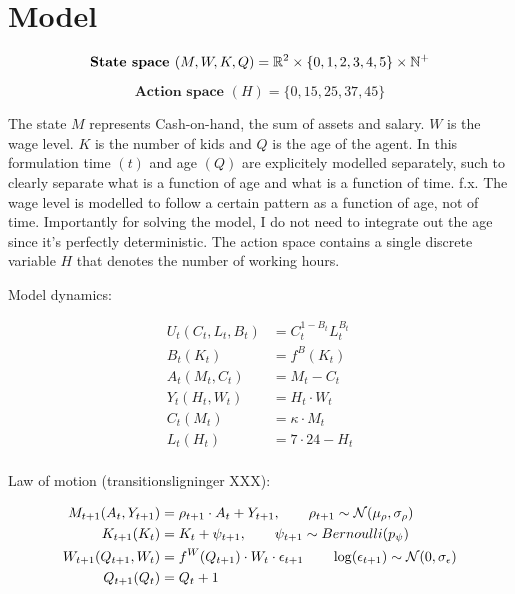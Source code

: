\section{Model}

\begin{equation}
    \textbf{State space } (M, W, K, Q) = \mathbb{R}^{2} \times \{0, 1, 2, 3, 4, 5\} \times \mathbb{N}^{+}
\end{equation}

\begin{equation}
    \textbf{Action space } (H) = \{0, 15, 25, 37, 45\}
\end{equation}

The state $M$ represents Cash-on-hand, the sum of assets and salary. $W$ is the wage level. $K$ is the number of kids and $Q$ is the age of the agent. In this formulation time $(t)$ and age $(Q)$ are explicitely modelled separately, such to clearly separate what is a function of age and what is a function of time. f.x. The wage level is modelled to follow a certain pattern as a function of age, not of time. Importantly for solving the model, I do not need to integrate out the age since it's perfectly deterministic. The action space contains a single discrete variable $H$ that denotes the number of working hours.

Model dynamics:

\begin{align}
    U_t (C_t, L_t, B_t) &= C_t^{1-B_t}L_t^{B_t} \label{eq:utility_v1}\\
    B_t (K_t) &= f^{B}(K_t) \label{eq:alpha_v1}\\
    A_t (M_t, C_t) &= M_t - C_t \label{eq:assets_v1}\\
    Y_t ( H_t, W_t) &= H_t \cdot W_t \label{eq:salary_v1}\\
    C_t (M_t) &= \kappa \cdot M_t \label{eq:consumption_v1}\\
    L_t(H_t) &= 7 \cdot 24 - H_t \label{eq:leisure_v1}\\
\end{align}

Law of motion (transitionsligninger XXX):

\begin{align}
    M_{t+1}(A_t, Y_{t+1}) &= \rho_{t+1} \cdot A_t + Y_{t+1}, \qquad \rho_{t+1} \sim \mathcal{N}(\mu_{\rho}, \sigma_{\rho}) \label{eq:cash_on_hand_v1} \\
    K_{t+1} (K_t) &= K_t + \psi_{t+1}, \qquad \psi_{t+1} \sim Bernoulli(p_{\psi}) \label{eq:kids_v1}\\
    W_{t+1} (Q_{t+1}, W_{t}) &= f^{W}(Q_{t+1}) \cdot W_t \cdot \epsilon_{t+1} \qquad \log (\epsilon_{t+1} ) \sim \mathcal{N}(0, \sigma_{\epsilon}) \label{eq:wage_v1}\\
    Q_{t+1} (Q_t)&= Q_t + 1 \label{eq:age_v1}
\end{align}

